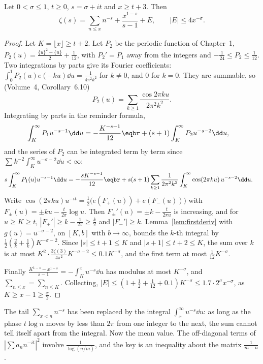 \begin{lemma}\label{lem:zetalengtht}
Let $0<\sigma\le1$, $t\ge0$, $s=\sigma+it$ and $x\ge t+3$. Then
\[
\zeta(s)=\sum_{n\le x}n^{-s}+\frac{x^{1-s}}{s-1}+E,\qquad|E|\le4x^{-\sigma}.
\]
\end{lemma}
\begin{proof}
Let $K=\lfloor x\rfloor\ge t+2$. Let $P_2$ be the periodic function of Chapter~1, $P_2(u)=\frac{\{u\}^2-\{u\}}2+\frac1{12}$, with $P_2'=P_1$ away from the integers and $-\frac1{24}\le P_2\le\frac1{12}$. Two integrations by parts give its Fourier coefficients: $\int_0^1P_2(u)e(-ku)\dd u=\frac1{4\pi^2k^2}$ for $k\ne0$, and $0$ for $k=0$. They are summable, so (Volume~4, Corollary~6.10)
\[
P_2(u)=\sum_{k\ge1}\frac{\cos2\pi ku}{2\pi^2k^2}.
\]
Integrating by parts in the reminder formula,
\[
\begin{aligned}\int_K^\infty P_1u^{-s-1}\dd u&=-\frac{K^{-s-1}}{12}\eqbr+(s+1)\int_K^\infty P_2u^{-s-2}\dd u,\end{aligned}
\]
and the series of $P_2$ can be integrated term by term since $\sum k^{-2}\int_K^\infty u^{-\sigma-2}\dd u<\infty$:
\[
\begin{aligned}s\int_K^\infty P_1(u)u^{-s-1}\dd u&=-\frac{sK^{-s-1}}{12}\eqbr+s(s+1)\sum_{k\ge1}\frac1{2\pi^2k^2}\int_K^\infty\cos(2\pi ku)\,u^{-s-2}\dd u.\end{aligned}
\]
Write $\cos(2\pi ku)u^{-it}=\frac12\bigl(e(F_+(u))+e(F_-(u))\bigr)$ with $F_\pm(u)=\pm ku-\frac t{2\pi}\log u$. Then $F_\pm'(u)=\pm k-\frac t{2\pi u}$ is increasing, and for $u\ge K\ge t$, $|F_+'|\ge k-\frac1{2\pi}\ge\frac k2$ and $|F_-'|\ge k$. Lemma~\ref{lem:firstderiv} with $g(u)=u^{-\sigma-2}$, on $[K,b]$ with $b\to\infty$, bounds the $k$-th integral by $\frac12(\frac2k+\frac1k)K^{-\sigma-2}$. Since $|s|\le t+1\le K$ and $|s+1|\le t+2\le K$, the sum over $k$ is at most $K^2\cdot\frac{3\zeta(3)}{4\pi^2}K^{-\sigma-2}\le0.1K^{-\sigma}$, and the first term at most $\frac1{12}K^{-\sigma}$.

Finally $\frac{K^{1-s}-x^{1-s}}{s-1}=-\int_K^xu^{-s}\dd u$ has modulus at most $K^{-\sigma}$, and $\sum_{n\le x}=\sum_{n\le K}$. Collecting, $|E|\le(1+\frac12+\frac1{12}+0.1)K^{-\sigma}\le1.7\cdot2^\sigma x^{-\sigma}$, as $K\ge x-1\ge\frac x2$.
\end{proof}

The tail $\sum_{x<n}n^{-s}$ has been replaced by the integral $\int_x^\infty u^{-s}\dd u$: as long as the phase $t\log n$ moves by less than $2\pi$ from one integer to the next, the sum cannot tell itself apart from the integral. Now the mean value. The off-diagonal terms of $|\sum a_nn^{-it}|^2$ involve $\frac1{\log(n/m)}$, and the key is an inequality about the matrix $\frac1{m-n}$.


